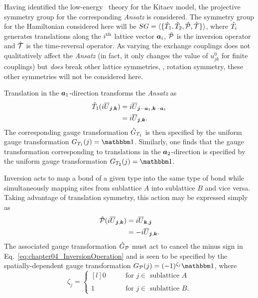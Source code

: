 Having identified the low-energy \ZZ~theory for the Kitaev model, the projective symmetry group for the corresponding \textit{Ansatz} is considered.
The symmetry group for the Hamiltonian considered here will be $SG = \langle \{ \hat{T}_1, \hat{T}_2, \hat{\mathcal{P}}, \hat{\mathcal{T}} \} \rangle$, where $\hat{T}_i$ generates translations along the $i^{\rm th}$ lattice vector $\bm{a}_i$, $\hat{\mathcal{P}}$ is the inversion operator and $\hat{\mathcal{T}}$ is the time-reversal operator.
As varying the exchange couplings does not qualitatively affect the \textit{Ansatz} (in fact, it only changes the value of $u^0_{jk}$ for finite couplings) but \textit{does} break other lattice symmetries, \eg, rotation symmetry, these other symmetries will not be considered here.

Translation in the $\bm{a}_1$-direction transforms the \textit{Ansatz} as
%
\begin{align}
	\hat{T}_1 (i \overline{U}_{\bm{j}, \bm{k}})	&= i \overline{U}_{\bm{j}-\bm{a}_1, \bm{k}-\bm{a}_1} \nonumber\\
												&= i \overline{U}_{\bm{j}, \bm{k}}.
\end{align} 
%
The corresponding gauge transformation $\hat{G}_{T_1}$ is then specified by the uniform gauge transformation $G_{T_1}(j) = \id$.
Similarly, one finds that the gauge transformation corresponding to translations in the $\bm{a}_2$-direction is specified by the uniform gauge transformation $G_{T_2}(j) = \id$.

Inversion acts to map a bond of a given type into the same type of bond while simultaneously mapping sites from sublattice $A$ into sublattice $B$ and vice versa.
Taking advantage of translation symmetry, this action may be expressed simply as
%
\begin{align}
	\hat{\mathcal{P}} (i \overline{U}_{\bm{j}, \bm{k}})	&= i \overline{U}_{\bm{k}, \bm{j}} \nonumber\\
														&= -i \overline{U}_{\bm{j}, \bm{k}}.
	\label{eq:chapter04_InversionOperation}
\end{align}
%
The associated gauge transformation $\hat{G}_{\mathcal{P}}$ must act to cancel the minus sign in Eq.~\eqref{eq:chapter04_InversionOperation} and is seen to be specified by the spatially-dependent gauge transformation $G_{\mathcal{P}}(j) = (-1)^{\zeta_j} \id$, where
%
\begin{equation}
	\zeta_j = \left\{
		\begin{matrix*}[l]
			0 &
			\qquad \text{for $j \in$ sublattice $A$} \\
			&\\
			1 &
			\qquad \text{for $j \in$ sublattice $B$}.
		\end{matrix*}
	\right.
\end{equation}
%

